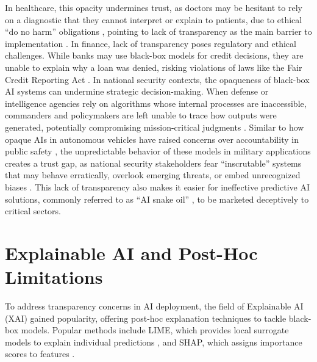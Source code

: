 In healthcare, this opacity undermines trust, as doctors may be hesitant to rely on a diagnostic that they cannot interpret or explain to patients, due to ethical ``do no harm'' obligations \cite{transparency_ai_in_healthcare}, pointing to lack of transparency as the main barrier to implementation \cite{Markus_2021}. In finance, lack of transparency poses regulatory and ethical challenges. While banks may use black-box models for credit decisions, they are unable to explain why a loan was denied, risking violations of laws like the Fair Credit Reporting Act \cite{maple2023airevolutionopportunitieschallenges}. In national security contexts, the opaqueness of black-box AI systems can undermine strategic decision-making. When defense or intelligence agencies rely on algorithms whose internal processes are inaccessible, commanders and policymakers are left unable to trace how outputs were generated, potentially compromising mission-critical judgments \cite{yu2022implications}. Similar to how opaque AIs in autonomous vehicles have raised concerns over accountability in public safety \cite{li2023knowledgedrivenautonomousdriving}, the unpredictable behavior of these models in military applications creates a trust gap, as national security stakeholders fear ``inscrutable'' systems that may behave erratically, overlook emerging threats, or embed unrecognized biases \cite{HollandMichel2020TheBB, Hagos2024NeuroSymbolicAF}. This lack of transparency also makes it easier for ineffective predictive AI solutions, commonly referred to as ``AI snake oil'' \cite{snakeoil}, to be marketed deceptively to critical sectors.




\section{Explainable AI and Post-Hoc Limitations}
\label{sec:sec_xai}

To address transparency concerns in AI deployment, the field of Explainable AI (XAI) gained popularity, offering post-hoc explanation techniques to tackle black-box models. Popular methods include LIME, which provides local surrogate models to explain individual predictions \cite{ribeiro2016whyitrustyou}, and SHAP, which assigns importance scores to features \cite{lundberg2017unifiedapproachinterpretingmodel}. 

